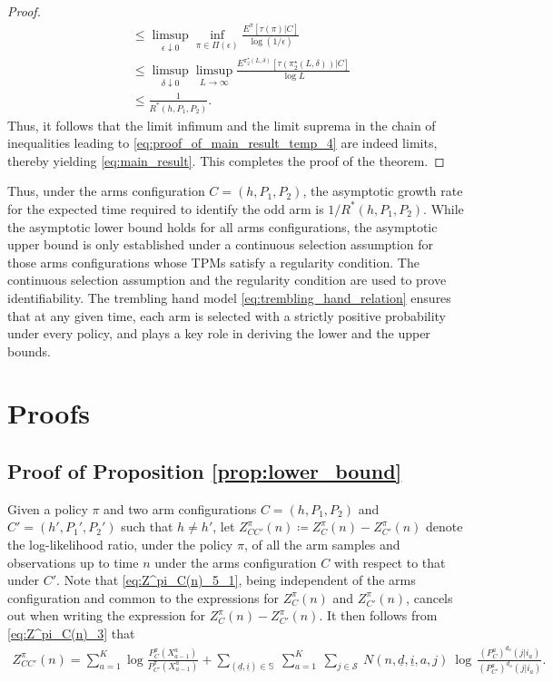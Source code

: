 \begin{proof}
\begin{align}
&\leq \limsup\limits_{\epsilon\downarrow 0}\inf\limits_{\pi\in\Pi(\epsilon)}\frac{E^\pi[\tau(\pi)|C]}{\log(1/\epsilon)} \nonumber\\
&\leq \limsup\limits_{\delta \downarrow 0}\limsup\limits_{L\to\infty}\frac{E^{\pi_2^\star(L, \delta)}[\tau(\pi_2^\star(L, \delta))|C]}{\log L}\nonumber\\
&\leq \frac{1}{R^*(h, P_1,P_2)}.
\label{eq:proof_of_main_result_temp_4}
\end{align}
Thus, it follows that the limit infimum and the limit suprema in the chain of inequalities leading to \eqref{eq:proof_of_main_result_temp_4} are indeed limits, thereby yielding \eqref{eq:main_result}. This completes the proof of the theorem.
\end{proof}
Thus, under the arms configuration $C=(h, P_1, P_2)$, the asymptotic growth rate for the expected time required to identify the odd arm is $1/R^*(h, P_1, P_2)$. While the asymptotic lower bound holds for all arms configurations, the asymptotic upper bound is only established under a continuous selection assumption for those arms configurations whose TPMs satisfy a regularity condition. The continuous selection assumption and the regularity condition are used to prove  identifiability. The trembling hand model \eqref{eq:trembling_hand_relation} ensures that at any given time, each arm is selected with a strictly positive probability under every policy, and plays a key role in deriving the lower and the upper bounds.

\section{Proofs}
\label{sec:proofs}
\subsection{Proof of Proposition \ref{prop:lower_bound}}\label{appndx:proof_of_prop_lower_bound}
Given a policy $\pi$ and two arm configurations $C=(h, P_1, P_2)$ and $C'=(h', P_1', P_2')$ such that $h\neq h'$, let $Z^\pi_{CC'}(n)\coloneqq Z^\pi_C(n)-Z^\pi_{C'}(n)$ denote the log-likelihood ratio, under the policy $\pi$, of all the arm samples and observations up to time $n$ under the arms configuration $C$ with respect to that under $C'$. Note that \eqref{eq:Z^pi_C(n)_5_1}, being independent of the arms configuration and common to the expressions for $Z^\pi_C(n)$ and $Z^\pi_{C'}(n)$, cancels out when writing the expression for $Z^\pi_C(n)-Z^\pi_{C'}(n)$. It then follows from \eqref{eq:Z^pi_C(n)_3} that
\begin{align}
	Z^\pi_{CC'}(n) = \sum\limits_{a=1}^{K} \log \frac{P^\pi_C(X_{a-1}^a)}{P^\pi_{C'}(X_{a-1}^a)} + \sum\limits_{(\underline{d}, \underline{i}) \in \mathbb{S}} ~\sum\limits_{a=1}^{K}~\sum\limits_{j\in \mathcal{S}}~N(n, \underline{d}, \underline{i}, a, j)~\log \, \frac{(P_C^a)^{d_a}(j|i_a)}{(P_{C'}^a)^{d_a}(j|i_a)}.
\label{eq:Z_pi_CC'(n)_2}
\end{align}


